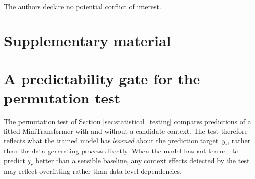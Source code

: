 \documentclass[AMA,Times1COL]{WileyNJDv5} %
\begin{document}
The authors declare no potential conflict of interest.









\appendix
\section*{Supplementary material}
\renewcommand{\thesection}{S\arabic{section}}
\setcounter{section}{0}

\section{A predictability gate for the permutation test}\label{sec:supp_gate}

The permutation test of Section \ref{sec:statistical_testing} compares predictions of a fitted MiniTransformer with and without a candidate context. The test therefore reflects what the trained model has \emph{learned} about the prediction target~$y_r$, rather than the data-generating process directly. When the model has not learned to predict $y_r$ better than a sensible baseline, any context effects detected by the test may reflect overfitting rather than data-level dependencies.
\end{document}
